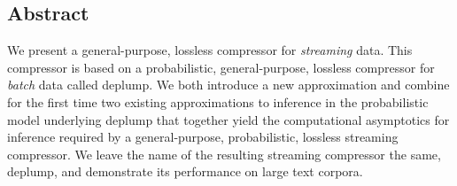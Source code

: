 \subsection*{Abstract}

We present a general-purpose, lossless compressor for {\em streaming} data.  This compressor is based on a probabilistic, general-purpose, lossless compressor for {\em batch} data called deplump.  We both introduce a new approximation and combine for the first time two existing approximations to inference in the probabilistic model underlying deplump that together yield the computational asymptotics for inference required by a general-purpose, probabilistic, lossless streaming compressor.  We leave the name of the resulting streaming compressor the same, deplump, and demonstrate its performance on large text corpora.